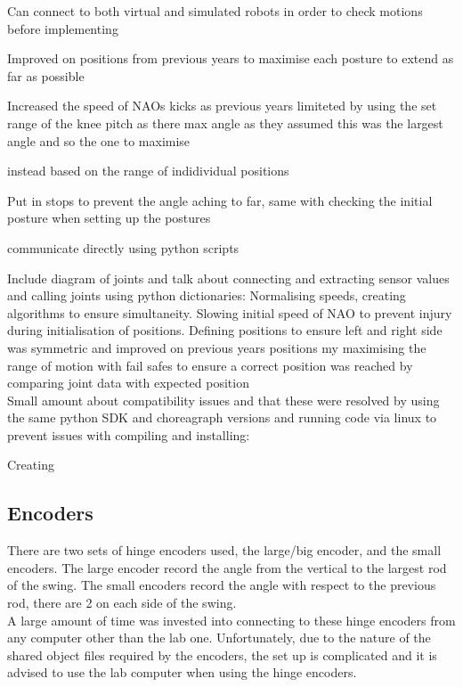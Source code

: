 \documentclass[11pt]{article}
\newcommand*\ruleline[1]{\par\noindent\raisebox{.8ex}{\makebox[\linewidth]{\hrulefill\hspace{1ex}\raisebox{-.8ex}{#1}\hspace{1ex}\hrulefill}}}
\begin{document}
Can connect to both virtual and simulated robots in order to check motions before implementing 

Improved on positions from previous years to maximise each posture to extend as far as possible 

Increased the speed of NAOs kicks as previous years limiteted by using the set range of the knee pitch as there max angle as they  assumed this was the largest angle and so the one to maximise

instead based on the range of indidividual positions 

Put in stops to prevent the angle aching to far, same with checking the initial posture when setting up the postures

communicate directly using python scripts


Include diagram of joints and talk about connecting and extracting sensor values and calling joints using python dictionaries:
Normalising speeds, creating algorithms to ensure simultaneity.
Slowing initial speed of NAO to prevent injury during initialisation of positions.
Defining positions to ensure left and right side was symmetric and improved on previous years positions my maximising the range of motion with fail safes to ensure a correct position was reached by comparing joint data with expected position\\

Small amount about compatibility issues and that these were resolved by using the same python SDK and choreagraph versions and running code via linux to prevent issues with compiling and installing: 

Creating 

\subsection{Encoders}
\ruleline{George Sheppard}
There are two sets of hinge encoders used, the large/big encoder, and the small encoders. The large encoder record the angle from the vertical to the largest rod of the swing. The small encoders record the angle with respect to the previous rod, there are 2 on each side of the swing.\\

A large amount of time was invested into connecting to these hinge encoders from any computer other than the lab one. Unfortunately, due to the nature of the shared object files required by the encoders, the set up is complicated and it is advised to use the lab computer when using the hinge encoders.\\
\end{document}
